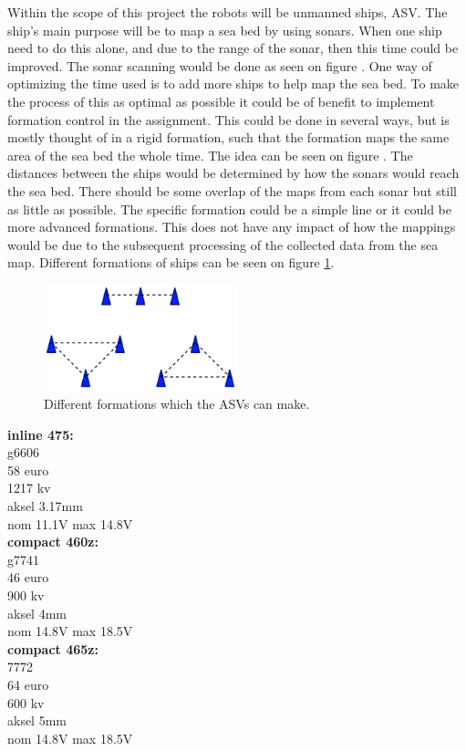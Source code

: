 Within the scope of this project the robots will be unmanned ships, \ac{ASV}. The ship's main purpose will be to map a sea bed by using sonars. When one ship need to do this alone, and due to the range of the sonar, then this time could be improved. The sonar scanning would be done as seen on figure . One way of optimizing the time used is to add more ships to help map the sea bed. To make the process of this as optimal as possible it could be of benefit to implement formation control in the assignment. This could be done in several ways, but is mostly thought of in a rigid formation, such that the formation maps the same area of the sea bed the whole time. The idea can be seen on figure . The distances between the ships would be determined by how the sonars would reach the sea bed. There should be some overlap of the maps from each sonar but still as little as possible. The specific formation could be a simple line or it could be more advanced formations. This does not have any impact of how the mappings would be due to the subsequent processing of the collected data from the sea map. Different formations of ships can be seen on figure \ref{fig:diffforms}.
\begin{figure}[ht]
	\includegraphics[width=0.5\textwidth]{fig/diffforms}
	\caption{Different formations which the \ac{ASV}s can make.}
	\label{fig:diffforms}
\end{figure}


\textbf{inline 475:}\\
g6606\\
58 euro\\
1217 kv\\
aksel 3.17mm\\
nom 11.1V max 14.8V\\

\textbf{compact 460z:}\\
g7741\\
46 euro\\
900 kv\\
aksel 4mm\\
nom 14.8V max 18.5V\\

\textbf{compact 465z:}\\
7772\\
64 euro\\
600 kv\\
aksel 5mm\\
nom 14.8V max 18.5V\\
